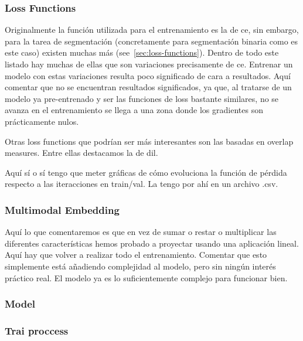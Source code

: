 \subsubsection{Loss Functions}

Originalmente la función utilizada para el entrenamiento es la de \gls{ce}, sin
embargo, para la tarea de segmentación (concretamente para segmentación binaria
como es este caso) existen muchas más (see\ \vref{sec:loss-functions}). Dentro
de todo este listado hay muchas de ellas que son variaciones precisamente de
\gls{ce}. Entrenar un modelo con estas variaciones resulta poco significado de
cara a resultados. Aquí comentar que no se encuentran resultados significados,
ya que, al tratarse de un modelo ya pre-entrenado y ser las funciones de loss
bastante similares, no se avanza en el entrenamiento se llega a una zona donde
los gradientes son prácticamente nulos.

Otras loss functions que podrían ser más interesantes son las basadas en
overlap measures. Entre ellas destacamos la de \gls{dil}.


Aquí sí o sí tengo que meter gráficas de cómo evoluciona la función de pérdida
respecto a las iteracciones en train/val. La tengo por ahí en un archivo .csv.


\subsubsection{Multimodal Embedding}

Aquí lo que comentaremos es que en vez de sumar o restar o multiplicar las
diferentes características hemos probado a proyectar usando una aplicación
lineal. Aquí hay que volver a realizar todo el entrenamiento. Comentar que esto
simplemente está añadiendo complejidad al modelo, pero sin ningún interés
práctico real. El modelo ya es lo suficientemente complejo para funcionar
bien.


\subsubsection{Model}


\subsubsection{Trai proccess}



